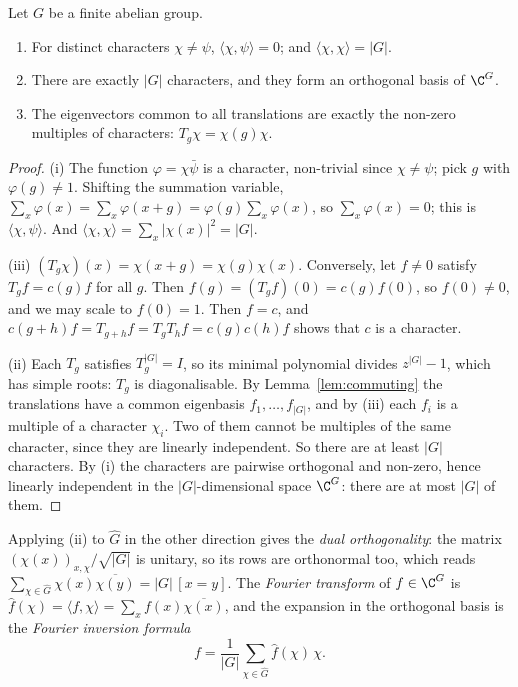 \begin{theorem}\label{thm:characters}
Let $G$ be a finite abelian group.
\begin{enumerate}[label=(\roman*)]
\item For distinct characters $\chi\ne\psi$, $\langle\chi,\psi\rangle=0$; and $\langle\chi,\chi\rangle=|G|$.
\item There are exactly $|G|$ characters, and they form an orthogonal basis of $\C^G$.
\item The eigenvectors common to all translations are exactly the non-zero multiples of characters: $T_g\chi=\chi(g)\chi$.
\end{enumerate}
\end{theorem}
\begin{proof}
(i) The function $\varphi=\chi\bar\psi$ is a character, non-trivial since $\chi\ne\psi$; pick $g$ with $\varphi(g)\ne1$. Shifting
the summation variable, $\sum_x\varphi(x)=\sum_x\varphi(x+g)=\varphi(g)\sum_x\varphi(x)$, so $\sum_x\varphi(x)=0$; this is
$\langle\chi,\psi\rangle$. And $\langle\chi,\chi\rangle=\sum_x|\chi(x)|^2=|G|$.

(iii) $(T_g\chi)(x)=\chi(x+g)=\chi(g)\chi(x)$. Conversely, let $f\ne0$ satisfy $T_gf=c(g)f$ for all $g$. Then $f(g)=(T_gf)(0)=
c(g)f(0)$, so $f(0)\ne0$, and we may scale to $f(0)=1$. Then $f=c$, and $c(g+h)f=T_{g+h}f=T_gT_hf=c(g)c(h)f$ shows that $c$ is a
character.

(ii) Each $T_g$ satisfies $T_g^{|G|}=I$, so its minimal polynomial divides $z^{|G|}-1$, which has simple roots: $T_g$ is
diagonalisable. By Lemma~\ref{lem:commuting} the translations have a common eigenbasis $f_1,\dots,f_{|G|}$, and by (iii) each
$f_i$ is a multiple of a character $\chi_i$. Two of them cannot be multiples of the same character, since they are linearly
independent. So there are at least $|G|$ characters. By (i) the characters are pairwise orthogonal and non-zero, hence linearly
independent in the $|G|$-dimensional space $\C^G$: there are at most $|G|$ of them.
\end{proof}

Applying (ii) to $\widehat G$ in the other direction gives the \emph{dual orthogonality}: the matrix $(\chi(x))_{x,\chi}/\sqrt{|G|}$ is
unitary, so its rows are orthonormal too, which reads $\sum_{\chi\in\widehat G}\chi(x)\overline{\chi(y)}=|G|\,[x=y]$. The
\emph{Fourier transform} of $f\in\C^G$ is $\hat f(\chi)=\langle f,\chi\rangle=\sum_xf(x)\overline{\chi(x)}$, and the expansion in the
orthogonal basis is the \emph{Fourier inversion formula}
\[
f=\frac1{|G|}\sum_{\chi\in\widehat G}\hat f(\chi)\,\chi.
\]

